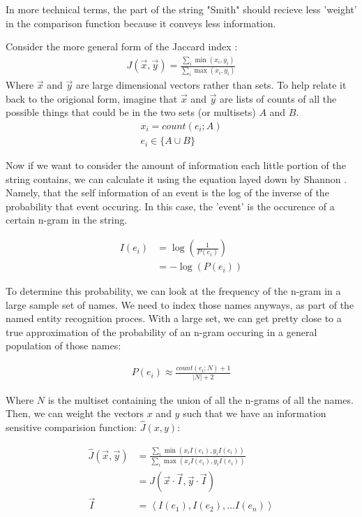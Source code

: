 \documentclass[11pt]{article}
\begin{document}
In more technical terms, the part of the string "Smith"
should recieve less 'weight' in the comparison function because
it conveys less information. 

Consider the more general form of the Jaccard index \cite{general}:
\begin{align*}
J(\vec{x},\vec{y}) = 
\frac{\sum_i \min(x_i, y_i)}{\sum_i \max(x_i, y_i)}
\end{align*}
Where $\vec{x}$ and $\vec{y}$ are large dimensional vectors rather 
than sets. To help relate it back to the origional form, 
imagine that $\vec{x}$ and $\vec{y}$ are lists
of counts of all the possible things that could be in the two sets
(or multisets) $A$ and $B$.
\begin{align*}
x_i = count(e_i; A)\\
e_i \in \{A \cup B \}
\end{align*}

Now if we want to consider the amount of information each little
portion of the string contains, we can calculate it
using the equation layed down by Shannon \cite{shannon}.
Namely, that the self information of an event is the log of the
inverse of the probability that event occuring. In this case,
the 'event' is the occurence of a certain n-gram in the string.

\begin{align*}
I(e_i) &= \log\left(\frac{1}{P(e_i)}\right)\\
&= -\log(P(e_i))
\end{align*}

To determine this probability, we can look at the frequency
of the n-gram in a large sample set of names.
We need to index those names anyways, as part of the named entity
recognition proces. With a large set, we can get pretty close to a true 
approximation of the probability of an n-gram occuring in 
a general population of those names:

\begin{align*}
P(e_i) \approx \frac{count(e_i; N)+1}{|N|+2}
\end{align*}

Where $N$ is the multiset containing the union of all the n-grams of
all the names. 
Then, we can weight the vectors $x$ and $y$ such that we have
an information sensitive comparision function: $\hat{J}(x,y)$:

\begin{align*}
\hat{J}(\vec{x},\vec{y}) &= \frac{
    \sum_i \min(x_iI(e_i), y_iI(e_i))
}{
    \sum_i \max(x_iI(e_i), y_iI(e_i))
}\\
&= J\left(\vec{x} \cdot \vec{I}, \vec{y} \cdot \vec{I} \right)\\
\vec{I} &= \left< I(e_1), I(e_2), ... I(e_n) \right>
\end{align*}
\end{document}

